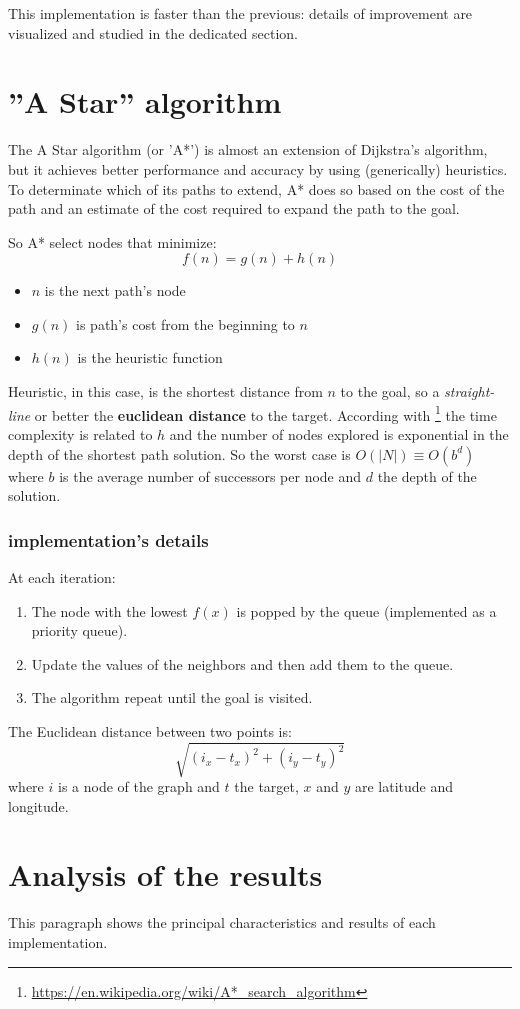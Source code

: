 \documentclass[a4paper,11pt]{report}
\begin{document}
This implementation is faster than the previous: details of improvement are visualized and studied in the dedicated section.

\section{''A Star'' algorithm}
The A Star algorithm (or 'A*') is almost an extension of Dijkstra's algorithm, but it achieves better performance and accuracy by using (generically) heuristics. To determinate which of its paths to extend, A* does so based on the cost of the path and an estimate of the cost required to expand the path to the goal.

So A* select nodes that minimize:
$$ f(n) = g(n) + h(n)$$
\begin{itemize}
	\item $n$ is the next path's node
	\item $g(n)$ is path's cost from the beginning to $n$
	\item $h(n)$ is the heuristic function
\end{itemize}
Heuristic, in this case, is the shortest distance from $n$ to the goal, so a \textit{straight-line} or better the \textbf{euclidean distance} to the target.
According with \footnote{\url{https://en.wikipedia.org/wiki/A*_search_algorithm}} the time complexity is related to $h$ and the number of nodes explored is exponential in the depth of the shortest path solution.
So the worst case is $O(|N|) \equiv O(b^d)$ where $b$ is the average number of successors per node and $d$ the depth of the solution.
\subsubsection*{implementation's details}
At each iteration:
\begin{enumerate}
	\item The node with the lowest $f(x)$ is popped by the queue (implemented as a priority queue).
	\item Update the values of the neighbors and then add them to the queue.
	\item The algorithm repeat until the goal is visited.
\end{enumerate}
The Euclidean distance between two points is: $$\sqrt{(i_x - t_x)^2 + (i_y - t_y)^2}$$
where $i$ is a node of the graph and $t$ the target, $x$ and $y$ are latitude and longitude.


\section{Analysis of the results}
This paragraph shows the principal characteristics and results of each implementation.
\end{document}
